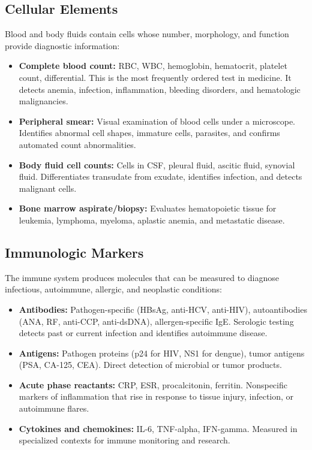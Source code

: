 \subsection{Cellular Elements}

Blood and body fluids contain cells whose number, morphology, and function provide diagnostic information:

\begin{itemize}
    \item \textbf{Complete blood count:} RBC, WBC, hemoglobin, hematocrit, platelet count, differential. This is the most frequently ordered test in medicine. It detects anemia, infection, inflammation, bleeding disorders, and hematologic malignancies.
    \item \textbf{Peripheral smear:} Visual examination of blood cells under a microscope. Identifies abnormal cell shapes, immature cells, parasites, and confirms automated count abnormalities.
    \item \textbf{Body fluid cell counts:} Cells in CSF, pleural fluid, ascitic fluid, synovial fluid. Differentiates transudate from exudate, identifies infection, and detects malignant cells.
    \item \textbf{Bone marrow aspirate/biopsy:} Evaluates hematopoietic tissue for leukemia, lymphoma, myeloma, aplastic anemia, and metastatic disease.
\end{itemize}

\subsection{Immunologic Markers}

The immune system produces molecules that can be measured to diagnose infectious, autoimmune, allergic, and neoplastic conditions:

\begin{itemize}
    \item \textbf{Antibodies:} Pathogen-specific (HBsAg, anti-HCV, anti-HIV), autoantibodies (ANA, RF, anti-CCP, anti-dsDNA), allergen-specific IgE. Serologic testing detects past or current infection and identifies autoimmune disease.
    \item \textbf{Antigens:} Pathogen proteins (p24 for HIV, NS1 for dengue), tumor antigens (PSA, CA-125, CEA). Direct detection of microbial or tumor products.
    \item \textbf{Acute phase reactants:} CRP, ESR, procalcitonin, ferritin. Nonspecific markers of inflammation that rise in response to tissue injury, infection, or autoimmune flares.
    \item \textbf{Cytokines and chemokines:} IL-6, TNF-alpha, IFN-gamma. Measured in specialized contexts for immune monitoring and research.
\end{itemize}

